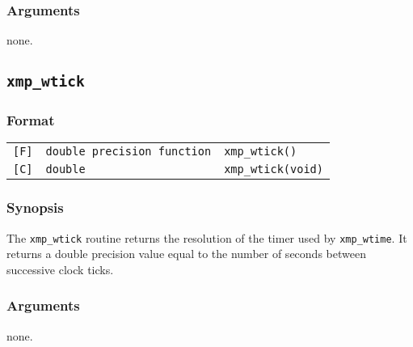 \subsubsection*{Arguments}
none.

\subsection{\tt xmp\_wtick}

\subsubsection*{Format}

\begin{tabular}{lll}
\verb![F]!&  {\tt double precision function}& {\tt xmp\_wtick()}\\
\verb![C]!&  {\tt double}& {\tt xmp\_wtick(void)}
\end{tabular}

\subsubsection*{Synopsis}
The {\tt xmp\_wtick} routine returns the resolution of the timer
used by {\tt xmp\_wtime}. 
It returns a double precision value equal to the number of seconds 
between successive clock ticks.

\subsubsection*{Arguments}
none.


%
%
%
%
%

